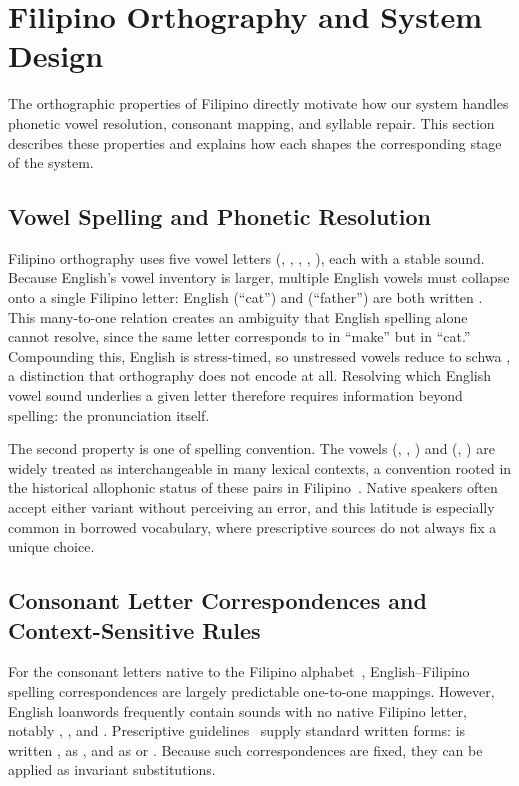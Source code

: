 \section{Filipino Orthography and System Design}\label{sec:filipino_orthography}

The orthographic properties of Filipino directly motivate how our system
handles phonetic vowel resolution, consonant mapping, and syllable repair. This
section describes these properties and explains how each shapes the
corresponding stage of the system.

\subsection{Vowel Spelling and Phonetic Resolution}

Filipino orthography uses five vowel letters (, , ,
, ), each with a stable sound. Because English's vowel
inventory is larger, multiple English vowels must collapse onto a single
Filipino letter: English \ipa{\ae} (``cat'') and 
(``father'') are both written . This many-to-one relation creates an
ambiguity that English spelling alone cannot resolve, since the same letter
 corresponds to  in ``make'' but \ipa{\ae} in
``cat.'' Compounding this, English is stress-timed, so unstressed vowels reduce
to schwa , a distinction that orthography does not encode at all.
Resolving which English vowel sound underlies a given letter therefore requires
information beyond spelling: the pronunciation itself.

The second property is one of spelling convention. The vowels (,
, ) and (, ) are widely treated as
interchangeable in many lexical contexts, a convention rooted in the historical
allophonic status of these pairs in Filipino~\cite{schachter1972}. Native
speakers often accept either variant without perceiving an error, and this
latitude is especially common in borrowed vocabulary, where prescriptive
sources do not always fix a unique choice.

\subsection{Consonant Letter Correspondences and Context-Sensitive Rules}

For the consonant letters native to the Filipino alphabet~\cite{llamzon1966},
English--Filipino spelling correspondences are largely predictable one-to-one
mappings. However, English loanwords frequently contain sounds with no native
Filipino letter, notably , , and .
Prescriptive guidelines~\cite{almario2014,llamzon1966} supply standard written
forms:  is written ,  as , and
 as  or . Because such correspondences are fixed,
they can be applied as invariant substitutions.

